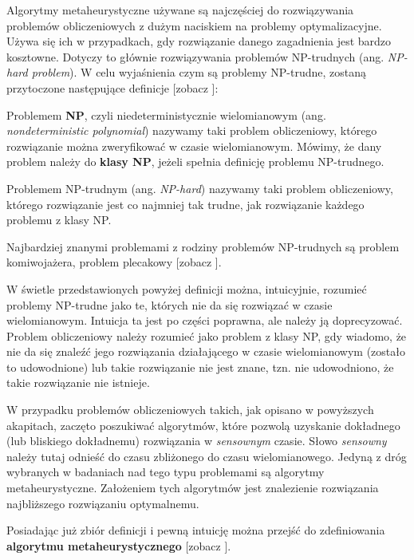 Algorytmy metaheurystyczne używane są najczęściej do rozwiązywania problemów obliczeniowych z dużym naciskiem na problemy optymalizacyjne. Używa się ich w przypadkach, gdy rozwiązanie danego zagadnienia jest bardzo kosztowne. Dotyczy to głównie rozwiązywania problemów NP-trudnych (ang. \textit{NP-hard problem}). W celu wyjaśnienia czym są problemy NP-trudne, zostaną przytoczone następujące definicje [zobacz \cite{ZlozonoscObliczeniowa}]:

\begin{definition}
Problemem \textbf{NP}, czyli niedeterministycznie wielomianowym (ang. \textit{nondeterministic polynomial}) nazywamy taki problem obliczeniowy, którego rozwiązanie można zweryfikować w czasie wielomianowym. Mówimy, że dany problem należy do \textbf{klasy NP}, jeżeli spełnia definicję problemu NP-trudnego.
\end{definition}

\begin{definition}
Problemem NP-trudnym (ang. \textit{NP-hard}) nazywamy taki problem obliczeniowy, którego rozwiązanie jest co najmniej tak trudne, jak rozwiązanie każdego problemu z klasy NP.
\end{definition}

Najbardziej znanymi problemami z rodziny problemów NP-trudnych są problem komiwojażera, problem plecakowy [zobacz \cite{ZlozonoscObliczeniowa}].

W świetle przedstawionych powyżej definicji można, intuicyjnie, rozumieć problemy NP-trudne jako te, których nie da się rozwiązać w czasie wielomianowym. Intuicja ta jest po części poprawna, ale należy ją doprecyzować. Problem obliczeniowy należy rozumieć jako problem z klasy NP, gdy wiadomo, że nie da się znaleźć jego rozwiązania działającego w czasie wielomianowym (zostało to udowodnione) lub takie rozwiązanie nie jest znane, tzn. nie udowodniono, że takie rozwiązanie nie istnieje.

W przypadku problemów obliczeniowych takich, jak opisano w powyższych akapitach, zaczęto poszukiwać algorytmów, które pozwolą uzyskanie dokładnego (lub bliskiego dokładnemu) rozwiązania w \textit{sensownym} czasie. Słowo \textit{sensowny} należy tutaj odnieść do czasu zbliżonego do czasu wielomianowego. Jedyną z dróg wybranych w badaniach nad tego typu problemami są algorytmy metaheurystyczne. Założeniem tych algorytmów jest znalezienie rozwiązania najbliższego rozwiązaniu optymalnemu. 

Posiadając już zbiór definicji i pewną intuicję można przejść do zdefiniowania \textbf{algorytmu metaheurystycznego} [zobacz \cite{EssentialsOfMetaheuristics}].

